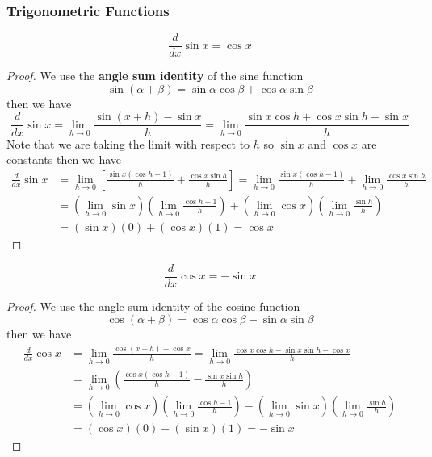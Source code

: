 \subsubsection*{Trigonometric Functions}
\begin{theorem}
    \[\frac{d}{dx}\sin x=\cos x\]
\end{theorem}
\begin{proof}
    We use the \textbf{angle sum identity} of the sine function
    \[\sin(\alpha+\beta)=\sin\alpha\cos\beta+\cos\alpha\sin\beta\]
    then we have
    \[\frac{d}{dx}\sin x=\lim_{h\to 0}\frac{\sin(x+h)-\sin x}{h}
    =\lim_{h\to 0}\frac{\sin x\cos h+\cos x\sin h-\sin x}{h}\]
    Note that we are taking the limit with respect to \(h\) so \(\sin x\) and
    \(\cos x\) are constants then we have
    \begin{align*}
        \frac{d}{dx}\sin x
        &= \lim_{h\to 0}\left[\frac{\sin x(\cos h-1)}{h}
        +\frac{\cos x\sin h}{h}\right]
        =\lim_{h\to 0}\frac{\sin x(\cos h-1)}{h}
        +\lim_{h\to 0}\frac{\cos x\sin h}{h}  \\
        &= \left(\lim_{h\to 0}\sin x\right)
        \left(\lim_{h\to 0}\frac{\cos h-1}{h}\right)
        +\left(\lim_{h\to 0}\cos x\right)
        \left(\lim_{h\to 0}\frac{\sin h}{h}\right)  \\
        &= (\sin x)(0)+(\cos x)(1) =\cos x
    \end{align*}
\end{proof}
\begin{theorem}
    \[\frac{d}{dx}\cos x=-\sin x\]
\end{theorem}
\begin{proof}
    We use the angle sum identity of the cosine function
    \[\cos(\alpha+\beta)=\cos\alpha\cos\beta-\sin\alpha\sin\beta\]
    then we have
    \begin{align*}
        \frac{d}{dx}\cos x
        &= \lim_{h\to 0}\frac{\cos(x+h)-\cos x}{h}
        =\lim_{h\to 0}\frac{\cos x\cos h-\sin x\sin h-\cos x}{h}  \\
        &= \lim_{h\to 0}\left(\frac{\cos x(\cos h-1)}{h}
        -\frac{\sin x\sin h}{h}\right)  \\
        &= \left(\lim_{h\to 0}\cos x\right)
        \left(\lim_{h\to 0}\frac{\cos h-1}{h}\right)
        -\left(\lim_{h\to 0}\sin x\right)
        \left(\lim_{h\to 0}\frac{\sin h}{h}\right)  \\
        &= (\cos x)(0)-(\sin x)(1)=-\sin x
    \end{align*}
\end{proof}

